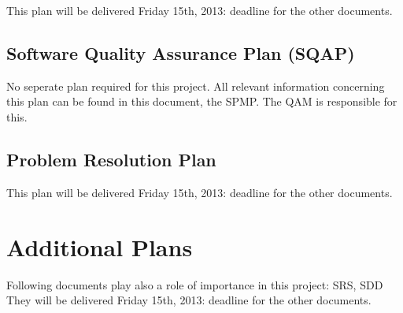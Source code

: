 \documentclass[9pt]{article}
\begin{document}
This plan will be delivered Friday 15th, 2013: deadline for the other
documents.

\subsection{Software Quality Assurance Plan
(SQAP)}\label{software-quality-assurance-plan-sqap}

No seperate plan required for this project. All relevant information
concerning this plan can be found in this document, the SPMP. The QAM is
responsible for this.

\subsection{Problem Resolution Plan}\label{problem-resolution-plan}

This plan will be delivered Friday 15th, 2013: deadline for the other
documents.

\section{Additional Plans}\label{additional-plans}

Following documents play also a role of importance in this project: SRS,
SDD They will be delivered Friday 15th, 2013: deadline for the other
documents.
\end{document}
